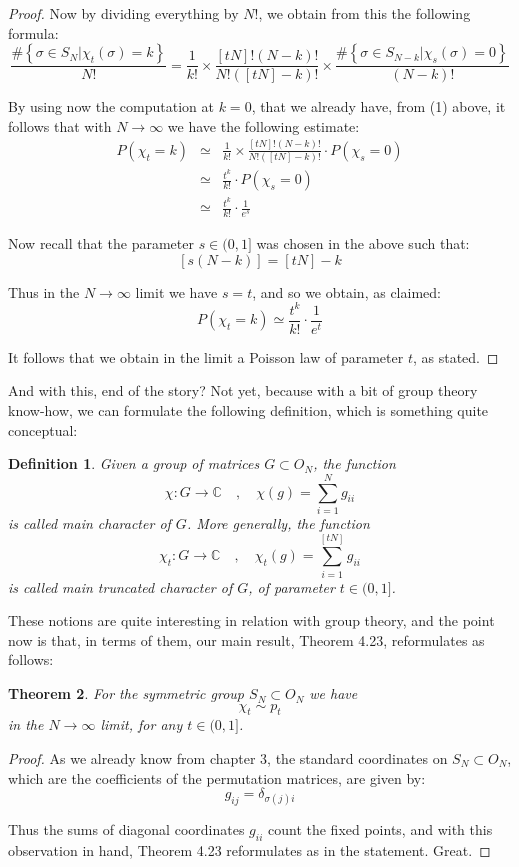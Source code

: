 \documentclass[12pt]{amsbook}
\newtheorem{theorem}{Theorem}[chapter]
\newtheorem{definition}[theorem]{Definition}
\begin{document}
\begin{proof}
Now by dividing everything by $N!$, we obtain from this the following formula:
$$\frac{\#\left\{\sigma\in S_N\Big|\chi_t(\sigma)=k\right\}}{N!}=\frac{1}{k!}\times\frac{[tN]!(N-k)!}{N!([tN]-k)!}\times\frac{\#\left\{\sigma\in S_{N-k}\Big|\chi_s(\sigma)=0\right\}}{(N-k)!}$$

By using now the computation at $k=0$, that we already have, from (1) above, it follows that with $N\to\infty$ we have the following estimate:
\begin{eqnarray*}
P(\chi_t=k)
&\simeq&\frac{1}{k!}\times\frac{[tN]!(N-k)!}{N!([tN]-k)!}\cdot P(\chi_s=0)\\
&\simeq&\frac{t^k}{k!}\cdot P(\chi_s=0)\\
&\simeq&\frac{t^k}{k!}\cdot\frac{1}{e^s}
\end{eqnarray*}

Now recall that the parameter $s\in(0,1]$ was chosen in the above such that:
$$[s(N-k)]=[tN]-k$$

Thus in the $N\to\infty$ limit we have $s=t$, and so we obtain, as claimed:
$$P(\chi_t=k)\simeq\frac{t^k}{k!}\cdot\frac{1}{e^t}$$

It follows that we obtain in the limit a Poisson law of parameter $t$, as stated.
\end{proof}

And with this, end of the story? Not yet, because with a bit of group theory know-how, we can formulate the following definition, which is something quite conceptual:

\begin{definition}
Given a group of matrices $G\subset O_N$, the function
$$\chi:G\to\mathbb C\quad,\quad 
\chi(g)=\sum_{i=1}^Ng_{ii}$$
is called main character of $G$. More generally, the function
$$\chi_t:G\to\mathbb C\quad,\quad 
\chi_t(g)=\sum_{i=1}^{[tN]}g_{ii}$$
is called main truncated character of $G$, of parameter $t\in(0,1]$.
\end{definition}

These notions are quite interesting in relation with group theory, and the point now is that, in terms of them, our main result, Theorem 4.23, reformulates as follows:

\begin{theorem}
For the symmetric group $S_N\subset O_N$ we have
$$\chi_t\sim p_t$$
in the $N\to\infty$ limit, for any $t\in(0,1]$.
\end{theorem} 

\begin{proof}
As we already know from chapter 3, the standard coordinates on $S_N\subset O_N$, which are the coefficients of the permutation matrices, are given by:
$$g_{ij}=\delta_{\sigma(j)i}$$

Thus the sums of diagonal coordinates $g_{ii}$ count the fixed points, and with this observation in hand, Theorem 4.23 reformulates as in the statement. Great.
\end{proof}
\end{document}
